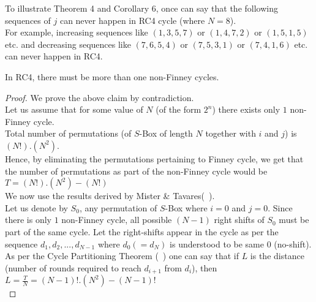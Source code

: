 \documentclass{llncs}
\begin{document}
To illustrate Theorem 4 and Corollary 6, once can say that the following sequences of $j$ can never happen in RC4 cycle (where $N=8$). \\

For example, increasing sequences like $(1, 3, 5, 7)$ or $(1, 4, 7, 2)$ or $(1, 5, 1, 5)$ etc. and decreasing sequences like $(7, 6, 5, 4)$ or $(7, 5, 3, 1)$ or $(7, 4, 1, 6)$ etc. can never happen in RC4. \\

\begin{theorem}

In RC4, there must be more than one non-Finney cycles. 

\end{theorem}

\begin{proof}

We prove the above claim by contradiction. \\

Let us assume that for some value of $N$ (of the form $2^n$) there exists only $1$ non-Finney cycle. \\

Total number of permutations (of $S$-Box of length $N$ together with $i$ and $j$) is $(N!).(N^2)$. \\

Hence, by eliminating the permutations pertaining to Finney cycle, we get that the number of permutations as part of the non-Finney cycle would be \\
 
$T = (N!).(N^2) - (N!)$ \\

We now use the results derived by Mister \& Tavares(~\cite{mister}). \\

Let us denote by $S_{0}$, any permutation of $S$-Box where $i=0$ and $j=0$. Since there is only $1$ non-Finney cycle, all possible $(N-1)$ right shifts of $S_{0}$ must be part of the same cycle. Let the right-shifts appear in the cycle as per the sequence $d_{1}, d_{2},..., d_{N-1}$ where $d_{0} (=d_{N})$ is understood to be same $0$ (no-shift). As per the Cycle Partitioning Theorem (~\cite{mister}) one can say that if $L$ is the distance (number of rounds required to reach $d_{i+1}$ from $d_{i}$), then \\

$L = \frac{T}{N} = (N-1)!.(N^2) - (N-1)!$ \\


\end{proof}
\end{document}
